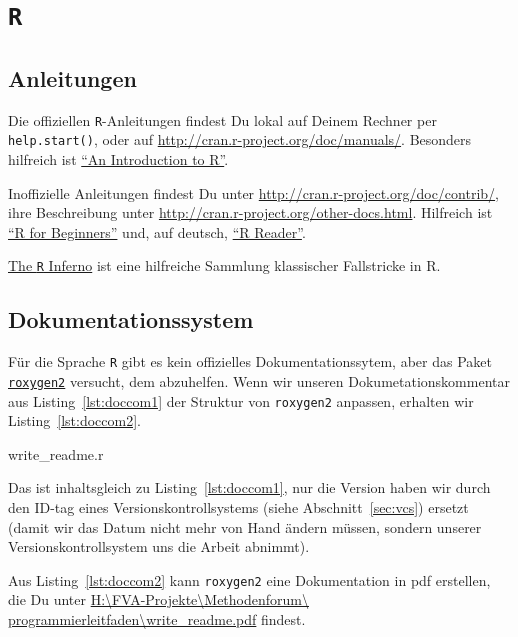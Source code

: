 \documentclass[twoside]{scrreprt}
\providecommand{\R}{\texttt{R}}
\providecommand{\code}[1]{\texttt{#1}}
\providecommand{\proot}{%
H:\textbackslash{}FVA-Projekte\textbackslash{}Methodenforum\textbackslash{}%
}
\providecommand{\pdir}{\proot{}programmierleitfaden\textbackslash{}}
\begin{document}
\section{\R{}}
\subsection{Anleitungen }
Die offiziellen  \R{}-Anleitungen findest Du lokal auf Deinem Rechner per
\code{help.start()}, oder auf \url{http://cran.r-project.org/doc/manuals/}.
Besonders hilfreich ist
\linebreak{}
\href{http://cran.r-project.org/doc/manuals/r-release/R-intro.pdf}
{"`An Introduction to R"'}.

Inoffizielle Anleitungen findest Du unter
\url{http://cran.r-project.org/doc/contrib/}, ihre Beschreibung unter
\url{http://cran.r-project.org/other-docs.html}. Hilfreich ist
\href{http://cran.r-project.org/doc/contrib/Paradis-rdebuts_en.pdf}
{"`R for Beginners"'}
und, auf deutsch,
\href{http://cran.r-project.org/doc/contrib/Grosz+Peters-R-Reader.pdf}
{"`R Reader"'}.

\href{http://www.burns-stat.com/pages/Tutor/R_inferno.pdf}{The \R{} Inferno} ist
eine hilfreiche Sammlung klassischer Fallstricke in R.

\subsection{Dokumentationssystem}
F\"u{}r die Sprache \R{}
gibt es kein offizielles Dokumentationssytem, aber
das Paket \href{http://cran.r-project.org/web/packages/roxygen2/index.html}
{\code{roxygen2}} versucht, dem abzuhelfen.
Wenn wir unseren Dokumetationskommentar aus Listing~\ref{lst:doccom1} der
Struktur von \code{roxygen2} anpassen, erhalten wir Listing~\ref{lst:doccom2}.

%
{write_readme.r}

Das ist inhaltsgleich zu  Listing~\ref{lst:doccom1}, nur die Version haben wir
durch den ID-tag eines Versionskontrollsystems (siehe Abschnitt~\ref{sec:vcs})
ersetzt (damit wir das Datum nicht mehr von Hand
\"a{}ndern m\"u{}ssen, sondern unserer Versionskontrollsystem uns die Arbeit
abnimmt).

Aus Listing~\ref{lst:doccom2}  kann \code{roxygen2} eine Dokumentation in pdf
erstellen, die Du unter \href{write_readme.pdf}{\pdir{}write\_readme.pdf}
findest.
\end{document}
